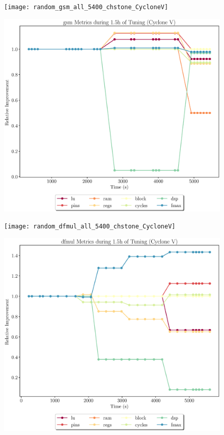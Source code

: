 \documentclass[12pt, a4paper]{article}
\begin{document}
\begin{figure}[htpb]
    \centering
    \begin{minipage}{.48\textwidth}
        \texttt{[image: random\_gsm\_all\_5400\_chstone\_CycloneV]}
    \end{minipage}%
    \hfill
    \begin{minipage}{.48\textwidth}
        \includegraphics[scale=.25]{gsm_all_5400_chstone_CycloneV}
    \end{minipage}%

    \begin{minipage}{.48\textwidth}
        \texttt{[image: random\_dfmul\_all\_5400\_chstone\_CycloneV]}
    \end{minipage}%
    \hfill
    \begin{minipage}{.48\textwidth}
        \includegraphics[scale=.25]{dfmul_all_5400_chstone_CycloneV}
    \end{minipage}%


\end{figure}
\end{document}
